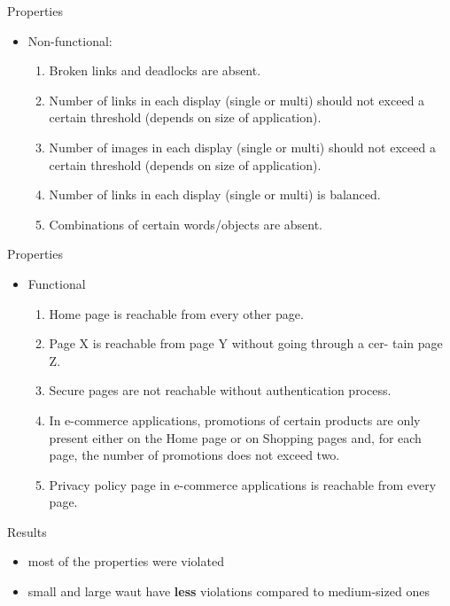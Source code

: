 \documentclass[usenames,dvipsnames]{beamer}
\theoremstyle{definition}
\begin{document}
\begin{frame}{Properties}
  \begin{itemize}
    \item Non-functional:
      \begin{enumerate}
        \item Broken links and deadlocks are absent.
        \item Number of links in each display (single or multi) should not exceed a certain threshold (depends on size of application).
        \item Number of images in each display (single or multi) should not exceed a certain threshold (depends on size of application).
        \item Number of links in each display (single or multi) is balanced.
        \item Combinations of certain words/objects are absent.
      \end{enumerate}
  \end{itemize}
\end{frame}

\begin{frame}{Properties}
  \begin{itemize}
    \item Functional 
      \begin{enumerate}
        \item Home page is reachable from every other page.
        \item Page X is reachable from page Y without going through a cer- tain page Z.
        \item Secure pages are not reachable without authentication process.
        \item In e-commerce applications, promotions of certain products are only present either on the Home page or on Shopping pages and, for each page, the number of promotions does not exceed two.
        \item Privacy policy page in e-commerce applications is reachable from every page.
      \end{enumerate}
  \end{itemize}
\end{frame}

\begin{frame}{Results}
  \begin{itemize}
    \item most of the properties were violated
    \item small and large \gls{waut} have \textbf{less} violations compared to medium-sized ones
  \end{itemize}
\end{frame}
\end{document}

